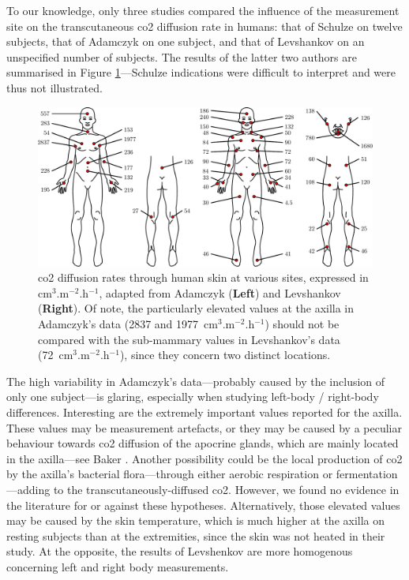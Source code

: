 To our knowledge, only three studies compared the influence of the measurement site on the transcutaneous \gls{co2} diffusion rate in humans: that of Schulze on twelve subjects\cite[Table~16]{schulze1943}, that of Adamczyk \etal{}\cite{adamczyk1966} on one subject, and that of Levshankov \etal{}\cite{levshankov1983} on an unspecified number of subjects. The results of the latter two authors are summarised in Figure \ref{fig:tcco2:positioning}---Schulze indications were difficult to interpret and were thus not illustrated.

\begin{figure}
	\centering
	\includegraphics[width=\linewidth]{1_main_matter/tcco2_figures/positioning.pdf}
	\caption[\gls{co2} diffusion rates through human skin at various sites retrieved from the literature.]{\gls{co2} diffusion rates through human skin at various sites, expressed in cm$^3$.m$^{-2}$.h$^{-1}$, adapted from Adamczyk \etal{}\cite{adamczyk1966} (\textbf{Left}) and Levshankov \etal{}\cite{levshankov1983} (\textbf{Right}). Of note, the particularly elevated values at the axilla in Adamczyk's data (2837 and 1977~cm$^3$.m$^{-2}$.h$^{-1}$) should not be compared with the sub-mammary values in Levshankov's data (72~cm$^3$.m$^{-2}$.h$^{-1}$), since they concern two distinct locations.}\label{fig:tcco2:positioning}
\end{figure}

The high variability in Adamczyk's data---probably caused by the inclusion of only one subject---is glaring, especially when studying left-body / right-body differences. Interesting are the extremely important values reported for the axilla. These values may be measurement artefacts, or they may be caused by a peculiar behaviour towards \gls{co2} diffusion of the apocrine glands, which are mainly located in the axilla---see Baker \etal{}\cite{baker2019}. Another possibility could be the local production of \gls{co2} by the axilla's bacterial flora---through either aerobic respiration or fermentation---adding to the transcutaneously-diffused \gls{co2}\cite{taylor2003}. However, we found no evidence in the literature for or against these hypotheses. Alternatively, those elevated values may be caused by the skin temperature, which is much higher at the axilla on resting subjects than at the extremities\cite{niu2001, sund2002}, since the skin was not heated in their study. At the opposite, the results of Levshenkov \etal{} are more homogenous concerning left and right body measurements.

